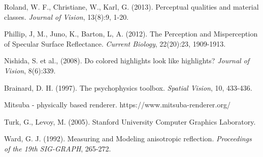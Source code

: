 \begin{thebibliography}{9}%


    Roland, W. F., Christiane, W., Karl, G. (2013).
    Perceptual qualities and material classes.
    {\it Journal of Vision}, 13(8):9, 1-20.

    Phillip, J, M., Juno, K., Barton, L, A. (2012).
    The Perception and Misperception of Specular Surface Reflectance.
    {\it Current Biology}, 22(20):23, 1909-1913.

    Nishida, S. et al., (2008).
    Do colored highlights look like highlights?
    {\it Journal of Vision}, 8(6):339.


    Brainard, D. H. (1997).
    The psychophysics toolbox.
    {\it Spatial Vision}, 10, 433-436.


    Mitsuba - physically based renderer. https://www.mitsuba-renderer.org/

    Turk, G., Levoy, M. (2005).
    Stanford University Computer Graphics Laboratory.

    Ward, G. J. (1992).
    Measuring and Modeling anisotropic reflection.
    {\it Proceedings of the 19th SIG-GRAPH}, 265-272.



\end{thebibliography}
